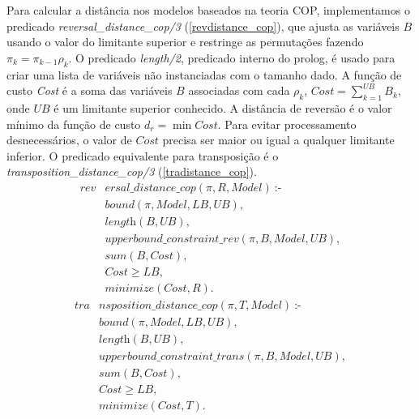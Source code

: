 Para calcular a distância nos modelos baseados na teoria COP,
implementamos o predicado \textit{reversal\_distance\_cop/3}
(\ref{revdistance_cop}), que ajusta as variáveis $B$ usando o valor do
limitante superior e restringe as permutações fazendo $\pi_{k}
= \pi_{k-1} \rho_{k}$. O predicado \textit{length/2}, predicado
interno do prolog, é usado para criar uma lista de variáveis não
instanciadas com o tamanho dado. A função de custo \textit{Cost} é a
soma das variáveis $B$ associadas com cada $\rho_{k}$, $Cost
= \sum_{k=1}^{UB} B_{k}$, onde $UB$ é um limitante superior
conhecido. A distância de reversão é o valor mínimo da função de custo
$d_{r} = \min Cost$. Para evitar processamento desnecessários, o valor
de $Cost$ precisa ser maior ou igual a qualquer limitante inferior. O
predicado equivalente para transposição é
o \textit{transposition\_distance\_cop/3} (\ref{tradistance_cop}).
\begin{align}
  \label{revdistance_cop}
  \textit{rev}&\textit{ersal\_distance\_cop}(\pi, R, Model)~\text{:-} \nonumber\\
  &\textit{bound}(\pi, Model, LB, UB), \nonumber\\
  &\textit{length}(B, UB), \nonumber \\
  &\textit{upperbound\_constraint\_rev}(\pi, B, Model, UB), \\
  &\textit{sum}(B, Cost), \nonumber \\
  &\textit{Cost} \ge \textit{LB}, \nonumber \\
  &\textit{minimize}(Cost, R). \nonumber
\end{align}
\begin{align}
  \label{tradistance_cop}
  \textit{tra}&\textit{nsposition\_distance\_cop}(\pi, T, Model)~\text{:-} \nonumber\\
  &\textit{bound}(\pi, Model, LB, UB), \nonumber\\
  &\textit{length}(B, UB), \nonumber \\
  &\textit{upperbound\_constraint\_trans}(\pi, B, Model, UB), \\
  &\textit{sum}(B, Cost), \nonumber \\
  &\textit{Cost} \ge \textit{LB}, \nonumber \\
  &\textit{minimize}(Cost, T). \nonumber
\end{align}

